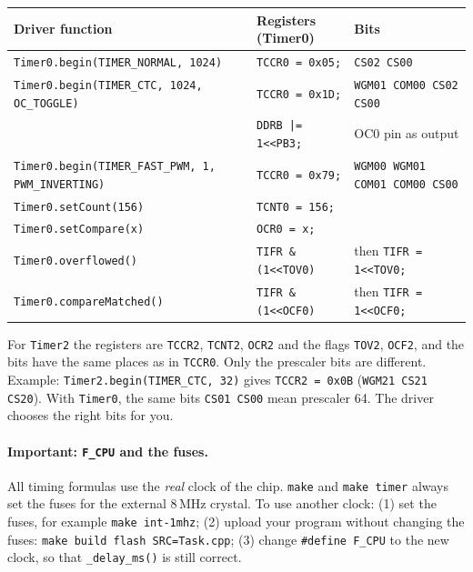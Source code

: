 \documentclass[11pt,a4paper]{article}
\newcommand{\code}[1]{\texttt{#1}}
\begin{document}
\begin{center}
\small
{\footnotesize\begin{tabular}{@{}lll@{}}
\toprule
\textbf{Driver function} & \textbf{Registers (Timer0)} & \textbf{Bits} \\
\midrule
\code{Timer0.begin(TIMER\_NORMAL, 1024)}          & \code{TCCR0 = 0x05;} & \code{CS02 CS00} \\
\code{Timer0.begin(TIMER\_CTC, 1024, OC\_TOGGLE)} & \code{TCCR0 = 0x1D;} & \code{WGM01 COM00 CS02 CS00} \\
                                                  & \code{DDRB |= 1<{}<PB3;} & OC0 pin as output \\
\code{Timer0.begin(TIMER\_FAST\_PWM, 1, PWM\_INVERTING)} & \code{TCCR0 = 0x79;} & \code{WGM00 WGM01 COM01 COM00 CS00} \\
\code{Timer0.setCount(156)}   & \code{TCNT0 = 156;} & \\
\code{Timer0.setCompare(x)}   & \code{OCR0 = x;} & \\
\code{Timer0.overflowed()}    & \code{TIFR \& (1<{}<TOV0)} & then \code{TIFR = 1<{}<TOV0;} \\
\code{Timer0.compareMatched()} & \code{TIFR \& (1<{}<OCF0)} & then \code{TIFR = 1<{}<OCF0;} \\
\bottomrule
\end{tabular}}
\end{center}

For \code{Timer2} the registers are \code{TCCR2}, \code{TCNT2}, \code{OCR2} and the
flags \code{TOV2}, \code{OCF2}, and the bits have the same places as in \code{TCCR0}.
Only the prescaler bits are different. Example: \code{Timer2.begin(TIMER\_CTC, 32)}
gives \code{TCCR2 = 0x0B} (\code{WGM21 CS21 CS20}). With \code{Timer0}, the same
bits \code{CS01 CS00} mean prescaler 64. The driver chooses the right bits for you.

\paragraph{Important: \code{F\_CPU} and the fuses.} All timing formulas use the
\emph{real} clock of the chip. \code{make} and \code{make timer} always set the
fuses for the external 8\,MHz crystal. To use another clock:
(1) set the fuses, for example \code{make int-1mhz};
(2) upload your program without changing the fuses:
\code{make build flash SRC=Task.cpp};
(3) change \code{\#define F\_CPU} to the new clock, so that
\code{\_delay\_ms()} is still correct.
\end{document}
